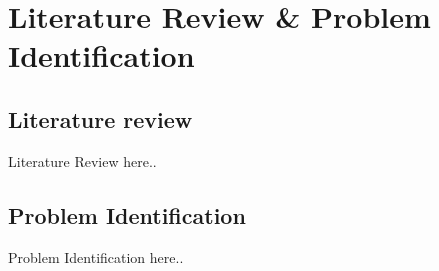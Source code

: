 \chapter{Literature Review \& Problem Identification}
\label{Chapter 2}

\section{Literature review}
Literature Review here..

\section{Problem Identification}
Problem Identification here..